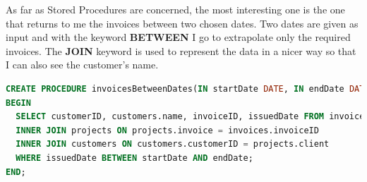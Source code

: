 \documentclass[12pt,a4paper]{article}
\begin{document}
\Sep \noindent
As far as Stored Procedures are concerned, the most interesting one is the one that returns to me the invoices between two chosen dates.
Two dates are given as input and with the keyword \textbf{BETWEEN} I go to extrapolate only the required invoices. The \textbf{JOIN} keyword is used to represent the data in a nicer way so that I can also see the customer's name.
\begin{lstlisting}[language = SQL,label={lst:invoices-dates}]
CREATE PROCEDURE invoicesBetweenDates(IN startDate DATE, IN endDate DATE)
BEGIN
  SELECT customerID, customers.name, invoiceID, issuedDate FROM invoices
  INNER JOIN projects ON projects.invoice = invoices.invoiceID
  INNER JOIN customers ON customers.customerID = projects.client
  WHERE issuedDate BETWEEN startDate AND endDate;
END;
\end{lstlisting}

\end{document}
